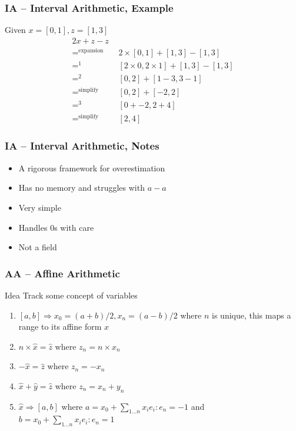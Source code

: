 \documentclass{beamer}
\begin{document}
\begin{frame}
\frametitle{IA -- Interval Arithmetic, Example}

Given $x = [0, 1], z = [1, 3]$
\begin{align*}
  2x + z - z \\
  =^{\text{expansion}} \quad & 2 \times [0, 1] + [1, 3] - [1, 3] \\
  =^{1}                \quad & [2 \times 0, 2 \times 1] + [1, 3] - [1, 3] \\
  =^{2}                \quad & [0, 2] + [1 - 3, 3 - 1] \\
  =^{\text{simplify}}  \quad & [0, 2] + [-2, 2] \\
  =^{3}                \quad & [0 + -2, 2 + 4] \\
  =^{\text{simplify}}  \quad & [2, 4]
\end{align*}
\end{frame}

\begin{frame}
\frametitle{IA -- Interval Arithmetic, Notes}

\begin{itemize}
  \item A rigorous framework for overestimation
  \item Has no memory and struggles with $a - a$
  \item Very simple
  \item Handles 0s with care
  \item Not a field
\end{itemize}
\end{frame}

\begin{frame}
\frametitle{AA -- Affine Arithmetic}

\begin{block}{Idea}
Track some concept of variables
\end{block}

\begin{enumerate}
  \item $[a, b] \Rightarrow x_0 = (a + b) / 2, x_n = (a - b) / 2$ where $n$ is unique, this maps a range to its affine form $\hat{x}$
  \item $n \times \hat{x} = \hat{z}$ where $z_n = n \times x_n$
  \item $-\hat{x} = \hat{z}$ where $z_n = -x_n$
  \item $\hat{x} + \hat{y} = \hat{z}$ where $z_n = x_n + y_n$
  \item $\hat{x} \Rightarrow [a, b]$ where $a = x_0 + \sum_{1\dots{}n}{x_ie_i}: e_n = -1$ and $b = x_0 + \sum_{1\dots{}n}{x_ie_i}: e_n = 1$
\end{enumerate}
\end{frame}
\end{document}

